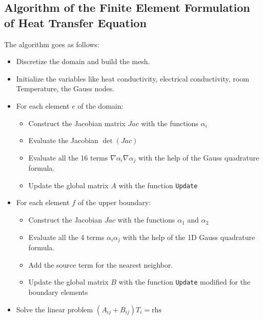 \subsection{Algorithm of the Finite Element Formulation of Heat Transfer Equation}
The algorithm goes as follows:
\begin{mdframed}
	\begin{itemize}
		\item Discretize the domain and build the mesh.
		\item Initialize the variables like heat conductivity, electrical conductivity, room Temperature, the Gauss nodes. 
		\item For each element $ e $ of the domain:
		\begin{itemize}
			\item Construct the Jacobian matrix $ Jac $ with the functions $ \alpha_i $
			\item Evaluate the Jacobian $ \det(Jac) $
			\item Evaluate all the 16 terms $ \nabla\alpha_i\nabla\alpha_j $ with the help of the Gauss quadrature formula.
			\item Update the global matrix $ A $ with the function \texttt{Update}
		\end{itemize}
		\item For each element $ f $ of the upper boundary:
		\begin{itemize}
			\item Construct the Jacobian $ Jac $ with the functions $ \alpha_1 $ and $ \alpha_2 $
			\item Evaluate all the 4 terms $ \alpha_i\alpha_j $ with the help of the 1D Gauss quadrature formula.
			\item Add the source term for the nearest neighbor.
			\item Update the global matrix $ B $ with the function \texttt{Update} modified for the boundary elements
		\end{itemize}
		\item Solve the linear problem $ (A_{ij}+B_{ij})T_i = \text{rhs} $
	\end{itemize}
	
\end{mdframed}


